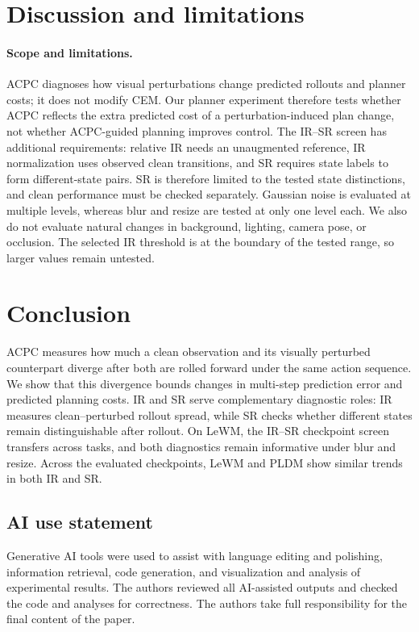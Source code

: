 \documentclass{article}
\begin{document}
\section{Discussion and limitations}\label{sec:disc}

\paragraph{Scope and limitations.}

ACPC diagnoses how visual perturbations change predicted rollouts and planner
costs; it does not modify CEM. Our planner experiment therefore tests whether
ACPC reflects the extra predicted cost of a perturbation-induced plan change,
not whether ACPC-guided planning improves control.
The IR--SR screen has additional requirements: relative IR needs an unaugmented
reference, IR normalization uses observed clean transitions, and SR requires
state labels to form different-state pairs. SR is therefore limited to the
tested state distinctions, and clean performance must be checked separately.
Gaussian noise is evaluated at multiple levels, whereas blur and resize are
tested at only one level each. We also do not evaluate natural changes in
background, lighting, camera pose, or occlusion. The selected IR threshold is
at the boundary of the tested range, so larger values remain untested.

\section{Conclusion}\label{sec:conc}

ACPC measures how much a clean observation and its visually perturbed
counterpart diverge after both are rolled forward under the same action
sequence. We show that this divergence bounds changes in multi-step prediction
error and predicted planning costs. IR and SR serve complementary diagnostic
roles: IR measures clean--perturbed rollout spread, while SR checks whether
different states remain distinguishable after rollout. On LeWM, the IR--SR
checkpoint screen transfers across tasks, and both diagnostics remain
informative under blur and resize. Across the evaluated checkpoints, LeWM and
PLDM show similar trends in both IR and SR\label{sec:main-text-end}.

\clearpage
\subsection*{AI use statement}
Generative AI tools were used to assist with language editing and polishing,
information retrieval, code generation, and visualization and analysis of
experimental results. The authors reviewed all AI-assisted outputs and
checked the code and analyses for correctness. The authors take full
responsibility for the final content of the paper.
\end{document}
